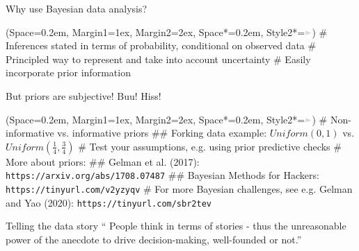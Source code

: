 \documentclass[12pt, aspectratio=149]{beamer}
\newcommand{\listSpace}{0.2em}
\theoremstyle{plain}
\begin{document}
\begin{frame}[fragile]{Why use Bayesian data analysis?}
	\begin{easylist}
		\ListProperties(Space=\listSpace, Margin1=1ex, Margin2=2ex, Space*=\listSpace, Style2*=$\color{bggraydark}\blacktriangleright$\space)
		# Inferences stated in terms of probability, conditional on observed data
        # Principled way to represent and take into account uncertainty
		# Easily incorporate prior information
	\end{easylist}
\end{frame}

\begin{frame}[fragile]{But priors are subjective! Buu! Hiss!}
	\begin{easylist}
		\ListProperties(Space=\listSpace, Margin1=1ex, Margin2=2ex, Space*=\listSpace, Style2*=$\color{bggraydark}\blacktriangleright$\space)
		# Non-informative vs. informative priors
		## Forking data example: $Uniform(0, 1)$ vs. $Uniform(\frac{1}{4}, \frac{3}{4})$
		# Test your assumptions, e.g. using prior predictive checks
		# More about priors:
		## Gelman et al. (2017): \footnotesize\texttt{https://arxiv.org/abs/1708.07487}
		## Bayesian Methods for Hackers: \footnotesize\texttt{https://tinyurl.com/v2yzyqv}	
		# For more Bayesian challenges, see e.g. Gelman and Yao (2020): \footnotesize\texttt{https://tinyurl.com/sbr2tev}
	\end{easylist}
\end{frame}

\begin{frame}[fragile]{Telling the data story}
	`` People think in terms of stories - thus the unreasonable power of the anecdote to drive decision-making, well-founded or not.''
\end{frame}
\end{document}
